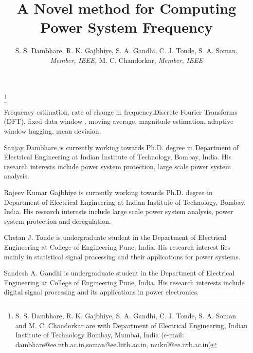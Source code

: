 \documentclass[journal]{IEEEtran}
\begin{document}
\title{A Novel method for Computing Power System Frequency}
\author{S. S. Dambhare, R. K. Gajbhiye, S. A. Gandhi, C. J. Tonde, S. A. Soman, {\it Member, IEEE,} M. C. Chandorkar, {\it Member, IEEE}}
\thanks{S. S. Dambhare, R. K. Gajbhiye, S. A. Gandhi, C. J. Tonde, S. A. Soman and M. C. Chandorkar are with Department of Electrical Engineering, Indian Institute of Technology Bombay, Mumbai, India (e-mail: dambhare@ee.iitb.ac.in,soman@ee.liitb.ac.in, mukul@ee.iitb.ac.in)}
\maketitle
\begin{abstract}

\end{abstract}
\begin{keywords}
Frequency estimation, rate of change in frequency,Discrete Fourier Transforms (DFT), fixed data window , moving average, magnitude estimation, adaptive window hugging, mean deviaion.
\end{keywords}



\appendices





\begin{IEEEbiographynophoto}{Sanjay Dambhare}
is currently working towards Ph.D. degree in Department of  Electrical
Engineering at Indian Institute of Technology, Bombay, India.
His research interests include power system protection, large scale power system analysis.
\end{IEEEbiographynophoto}

\begin{IEEEbiographynophoto}{Rajeev Kumar Gajbhiye}
is currently working towards Ph.D. degree in Department of  Electrical
Engineering at  Indian Institute of Technology, Bombay, India.
His research interests include large scale power system analysis, power system protection and deregulation.
\end{IEEEbiographynophoto}

\begin{IEEEbiographynophoto}{Chetan J. Tonde}
is undergraduate student in the  Department of  Electrical
Engineering at  College of Engineering Pune, India.
His research interest lies mainly in statistical signal
processing and their applications for power systems.
\end{IEEEbiographynophoto}

\begin{IEEEbiographynophoto}{Sandesh A. Gandhi}
is undergraduate student in the  Department of  Electrical
Engineering at  College of Engineering Pune, India.
His research interests include digital signal processing and its applications in power electronics.
\end{IEEEbiographynophoto}
\end{document}
